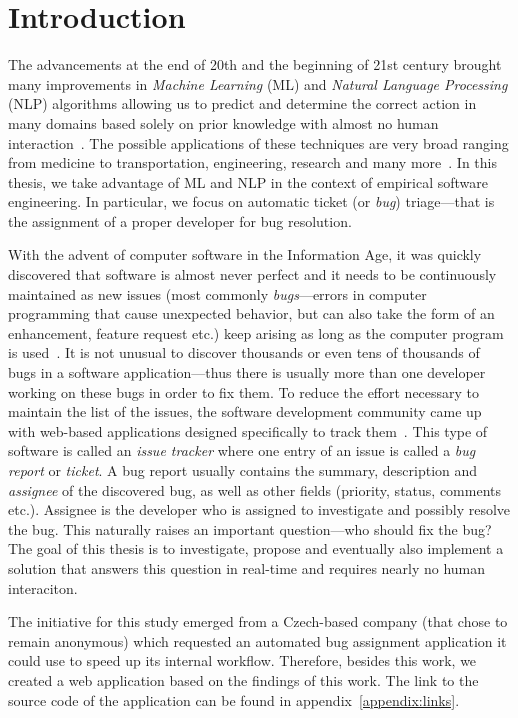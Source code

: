 \chapter{Introduction}

The advancements at the end of 20th and the beginning of 21st century brought many improvements in \textit{Machine Learning} (ML) and \textit{Natural Language Processing} (NLP) algorithms allowing us to predict and determine the correct action in many domains based solely on prior knowledge with almost no human interaction~\cite{carbonell1983overview}. The possible applications of these techniques are very broad ranging from medicine to transportation, engineering, research and many more~\cite{kononenko2001machine}\cite{nguyen1990neural}. In this thesis, we take advantage of ML and NLP in the context of empirical software engineering. In particular, we focus on automatic ticket (or \textit{bug}) triage---that is the assignment of a proper developer for bug resolution.

With the advent of computer software in the Information Age, it was quickly discovered that software is almost never perfect and it needs to be continuously maintained as new issues (most commonly \textit{bugs}---errors in computer programming that cause unexpected behavior, but can also take the form of an enhancement, feature request etc.) keep arising as long as the computer program is used~\cite{nist2002}. It is not unusual to discover thousands or even tens of thousands of bugs in a software application---thus there is usually more than one developer working on these bugs in order to fix them. To reduce the effort necessary to maintain the list of the issues, the software development community came up with web-based applications designed specifically to track them~\cite{bertram2010communication}. This type of software is called an \textit{issue tracker} where one entry of an issue is called a \textit{bug report} or \textit{ticket}. A bug report usually contains the summary, description and \textit{assignee} of the discovered bug, as well as other fields (priority, status, comments etc.). Assignee is the developer who is assigned to investigate and possibly resolve the bug. This naturally raises an important question---who should fix the bug?~\cite{Anvik2006} The goal of this thesis is to investigate, propose and eventually also implement a solution that answers this question in real-time and requires nearly no human interaciton.

The initiative for this study emerged from a Czech-based company (that chose to remain anonymous) which requested an automated bug assignment application it could use to speed up its internal workflow. Therefore, besides this work, we created a web application based on the findings of this work. The link to the source code of the application can be found in appendix~\ref{appendix:links}.

